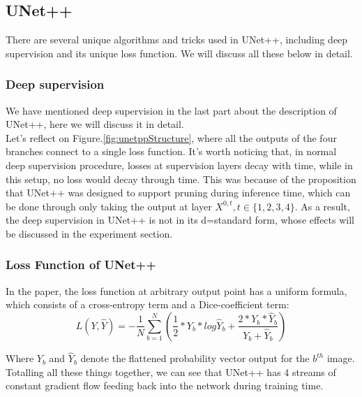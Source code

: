 \subsection{UNet++}
There are several unique algorithms and tricks used in UNet++, including deep supervision and its unique loss function. We will discuss all these below in detail.
\subsubsection{Deep supervision}
We have mentioned deep supervision in the last part about the description of UNet++, here we will discuss it in detail.\\
Let's reflect on Figure.\ref{fig:unetppStructure}, where all the outputs of the four branches connect to a single loss function. It's worth noticing that, in normal deep supervision procedure, losses at supervision layers decay with time, while in this setup, no loss would decay through time. This was because of the proposition that UNet++ was designed to support pruning during inference time, which can be done through only taking the output at layer $X^{0,t}, t\in \{1,2,3,4\}$. As a result, the deep supervision in UNet++ is not in its d=standard form, whose effects will be discussed in the experiment section.\\
\subsubsection{Loss Function of UNet++}
In the paper\cite{unet_pp}, the loss function at arbitrary output point has a uniform formula, which consists of a cross-entropy term and a Dice-coefficient term:
\begin{equation}
    \displaystyle L(Y, \hat Y)=-\frac{1}{N}\sum_{b=1}^{N}(\frac12 * Y_b * log\hat Y_b + \frac{2* Y_b*\hat Y_b}{Y_b + \hat Y_b})
\end{equation}

Where $Y_b$ and $\hat Y_b$ denote the flattened probability vector output for the $b^{th}$ image.\\

Totalling all these things together, we can see that UNet++ has 4 streams of constant gradient flow feeding back into the network during training time.
